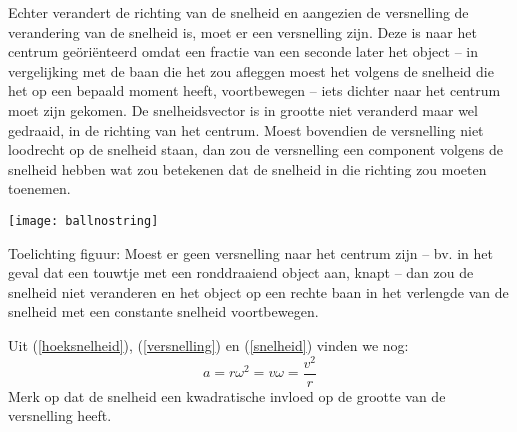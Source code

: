 \documentclass{ximera}
\begin{document}
Echter verandert de richting van de snelheid en aangezien de versnelling de verandering van de snelheid is, moet er een versnelling zijn. Deze is naar het centrum ge\"ori\"enteerd omdat een fractie van een seconde later het object -- in vergelijking met de baan die het zou afleggen moest het volgens de snelheid die het op een bepaald moment heeft, voortbewegen -- iets dichter naar het centrum moet zijn gekomen. De snelheidsvector is in grootte niet veranderd maar wel gedraaid, in de richting van het centrum. Moest bovendien de versnelling niet loodrecht op de snelheid staan, dan zou de versnelling een component volgens de snelheid hebben wat zou betekenen dat de snelheid in die richting zou moeten toenemen.
\begin{image}
	\texttt{[image: ballnostring]}
\end{image}
Toelichting figuur: Moest er geen versnelling naar het centrum zijn -- bv. in het geval dat een touwtje met een ronddraaiend object aan, knapt -- dan zou de snelheid niet veranderen en het object op een rechte baan in het verlengde van de snelheid met een constante snelheid voortbewegen.

Uit (\ref{hoeksnelheid}), (\ref{versnelling}) en (\ref{snelheid}) vinden we nog:
\begin{equation}
	a=r\omega^2=v\omega=\frac{v^2}{r}
\end{equation}
Merk op dat de snelheid een kwadratische invloed op de grootte van de versnelling heeft.
\end{document}
